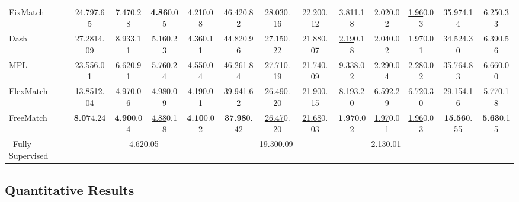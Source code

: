 \documentclass{article} \usepackage{iclr2023_conference,times}
\theoremstyle{plain}
\theoremstyle{definition}
\theoremstyle{remark}
\newcommand{\ourmethod}{FreeMatch\xspace}
\begin{document}
\begin{table}[!t]
{\begin{tabular}{l|cccc|ccc|ccc|cc}
 FixMatch \citep{sohn2020fixmatch} & 24.79{\scriptsize 7.65} & 7.47{\scriptsize 0.28} & \textbf{4.86}{\scriptsize 0.05} & 4.21{\scriptsize 0.08} & 46.42{\scriptsize 0.82} & 28.03{\scriptsize 0.16} & 22.20{\scriptsize 0.12} & 3.81{\scriptsize 1.18} & 2.02{\scriptsize 0.02}  & \underline{1.96}{\scriptsize 0.03} & 35.97{\scriptsize 4.14} & 6.25{\scriptsize 0.33} \\
 Dash \citep{xu2021dash} & 27.28{\scriptsize 14.09} & 8.93{\scriptsize 3.11} & 5.16{\scriptsize 0.23} & 4.36{\scriptsize 0.11} & 44.82{\scriptsize 0.96} & 27.15{\scriptsize 0.22} & 21.88{\scriptsize 0.07} & \underline{2.19}{\scriptsize 0.18} & 2.04{\scriptsize 0.02} & 1.97{\scriptsize 0.01}  & 34.52{\scriptsize 4.30} & 6.39{\scriptsize 0.56} \\
 MPL \citep{pham2021meta} & 23.55{\scriptsize 6.01} & 6.62{\scriptsize 0.91} & 5.76{\scriptsize 0.24} & 4.55{\scriptsize 0.04} & 46.26{\scriptsize 1.84} & {27.71\scriptsize 0.19} & 21.74{\scriptsize 0.09} & 9.33{\scriptsize 8.02} & 2.29{\scriptsize 0.04} & 2.28{\scriptsize 0.02}  & 35.76{\scriptsize 4.83} & 6.66{\scriptsize 0.00} \\
 FlexMatch \citep{zhang2021flexmatch} & \underline{13.85}{\scriptsize 12.04} & \underline{4.97}{\scriptsize 0.06} & 4.98{\scriptsize 0.09} & \underline{4.19}{\scriptsize 0.01} & \underline{39.94}{\scriptsize 1.62} & 26.49{\scriptsize 0.20} & 21.90{\scriptsize 0.15} & 8.19{\scriptsize 3.20} & 6.59{\scriptsize 2.29} & 6.72{\scriptsize 0.30} & \underline{29.15}{\scriptsize 4.16} & \underline{5.77}{\scriptsize 0.18} \\
 \ourmethod & \textbf{8.07}{\scriptsize 4.24} & \textbf{4.90}{\scriptsize 0.04} & \underline{4.88}{\scriptsize 0.18} & \textbf{4.10}{\scriptsize 0.02} & \textbf{37.98}{\scriptsize 0.42} & \underline{26.47}{\scriptsize 0.20} & \underline{21.68}{\scriptsize 0.03} & \textbf{1.97}{\scriptsize 0.02} & \underline{1.97}{\scriptsize 0.01} & \underline{1.96}{\scriptsize 0.03} & \textbf{15.56}{\scriptsize 0.55} & \textbf{5.63}{\scriptsize 0.15} \\
\midrule\,
Fully-Supervised    & \multicolumn{4}{c|}{4.62{\scriptsize 0.05}} & \multicolumn{3}{c|}{19.30{\scriptsize 0.09}}  & \multicolumn{3}{c|}{2.13{\scriptsize 0.01}} & \multicolumn{2}{c}{-}\\
\bottomrule
\end{tabular}
}
\vspace{-0.2in}
\end{table}


\subsection{Quantitative Results}
\end{document}
